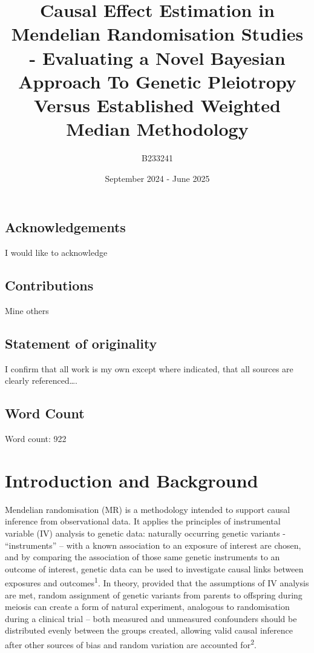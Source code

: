 \documentclass[
]{article}
\title{Causal Effect Estimation in Mendelian Randomisation Studies - Evaluating a Novel Bayesian Approach To Genetic Pleiotropy Versus Established Weighted Median Methodology}
\author{B233241}
\date{September 2024 - June 2025}
\begin{document}
\maketitle

{
\setcounter{tocdepth}{2}
\tableofcontents
}
\newpage

\subsection{Acknowledgements}\label{acknowledgements}

I would like to acknowledge

\subsection{Contributions}\label{contributions}

Mine others

\subsection{Statement of originality}\label{statement-of-originality}

I confirm that all work is my own except where indicated, that all sources are clearly referenced\ldots.

\subsection{Word Count}\label{word-count}

Word count:
922

\newpage

\section{Introduction and Background}\label{introduction-and-background}

Mendelian randomisation (MR) is a methodology intended to support causal inference from observational data. It applies the principles of instrumental variable (IV) analysis to genetic data: naturally occurring genetic variants - ``instruments'' -- with a known association to an exposure of interest are chosen, and by comparing the association of those same genetic instruments to an outcome of interest, genetic data can be used to investigate causal links between exposures and outcomes\textsuperscript{1}. In theory, provided that the assumptions of IV analysis are met, random assignment of genetic variants from parents to offspring during meiosis can create a form of natural experiment, analogous to randomisation during a clinical trial -- both measured and unmeasured confounders should be distributed evenly between the groups created, allowing valid causal inference after other sources of bias and random variation are accounted for\textsuperscript{2}.
\end{document}
